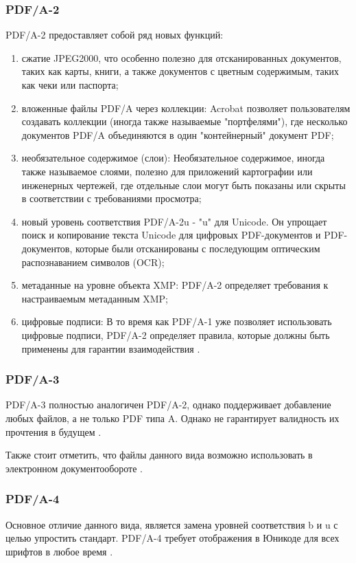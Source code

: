 \subsubsection{PDF/A-2}
PDF/A-2 предоставляет собой ряд новых функций:
\begin{enumerate}
\item сжатие JPEG2000, что особенно полезно для отсканированных документов, таких как карты, книги, а также документов с цветным содержимым, таких как чеки или паспорта;
\item вложенные файлы PDF/A через коллекции: Acrobat позволяет пользователям создавать коллекции (иногда также называемые "портфелями"), где несколько документов PDF/A объединяются в один "контейнерный" документ PDF;

\item необязательное содержимое (слои): Необязательное содержимое, иногда также называемое слоями, полезно для приложений картографии или инженерных чертежей, где отдельные слои могут быть показаны или скрыты в соответствии с требованиями просмотра;
\item новый уровень соответствия PDF/A-2u - "u" для Unicode. Он упрощает поиск и копирование текста Unicode для цифровых PDF-документов и PDF-документов, которые были отсканированы с последующим оптическим распознаванием символов (OCR);

\item метаданные на уровне объекта XMP: PDF/A-2 определяет требования к настраиваемым метаданным XMP;

\item цифровые подписи: В то время как PDF/A-1 уже позволяет использовать цифровые подписи, PDF/A-2 определяет правила, которые должны быть применены для гарантии взаимодействия \cite{pdf_a_2}.
\end{enumerate}
\subsubsection{PDF/A-3}
PDF/A-3 полностью аналогичен PDF/A-2, однако поддерживает добавление любых файлов, а не только PDF типа A. Однако не гарантирует валидность их прочтения в будущем \cite{pdf_a_2}.

Также стоит отметить, что файлы данного вида возможно использовать в электронном документообороте \cite{nalogi}.
\subsubsection{PDF/A-4}
Основное отличие данного вида, является замена уровней соответствия b и u с целью упростить стандарт. PDF/A-4 требует отображения в Юникоде для всех шрифтов в любое время \cite{pdf_a_4}.


